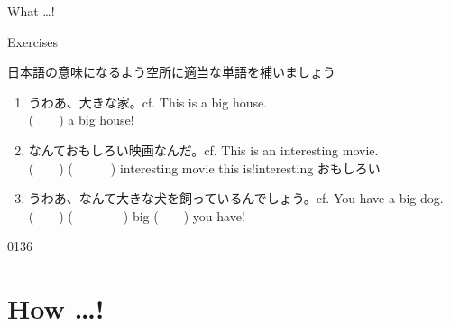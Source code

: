 \documentclass[aspectratio=169,xcolor={dvipsnames,table}]{beamer}
\begin{document}
\begin{frame}[plain]{What \ldots ! }
\hypertarget{WHAT}{}
\hfill\hyperlink{HOW}{}
\end{frame}
\begin{frame}[plain]{Exercises}

{\small 日本語の意味になるよう空所に適当な単語を補いましょう}
 \begin{enumerate}
  \item うわあ、大きな家。\hfill{\scriptsize cf. This is a big house.}\\
	(~~~~) a big house!
  \item なんておもしろい映画なんだ。\hfill{\scriptsize cf. This is an interesting movie.}\\
	(~~~~) (~~~~~~) interesting movie this is!\hfill{\scriptsize interesting  おもしろい}
  \item うわあ、なんて大きな犬を飼っているんでしょう。\hfill{\scriptsize cf. You have a big dog.}\\
	(~~~~) (~~~~~~~~) big (~~~~) you have!
 \end{enumerate}
\hfill{\tiny 0136}\,{\scriptsize {}}
\end{frame}
\section{How \ldots ! }
\end{document}
